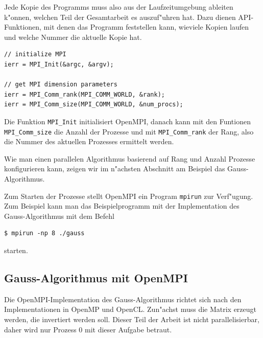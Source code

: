 Jede Kopie des Programms muss also aus der Laufzeitumgebung
ableiten k"onnen, welchen Teil der Gesamtarbeit es auszuf"uhren hat.
Dazu dienen API-Funktionen, mit denen das Programm feststellen kann,
wieviele Kopien laufen und welche Nummer die aktuelle Kopie hat.
\begin{verbatim}
// initialize MPI
ierr = MPI_Init(&argc, &argv);

// get MPI dimension parameters
ierr = MPI_Comm_rank(MPI_COMM_WORLD, &rank);
ierr = MPI_Comm_size(MPI_COMM_WORLD, &num_procs);
\end{verbatim}
Die Funktion \verb+MPI_Init+ initialisiert OpenMPI, danach kann mit
den Funtionen \verb+MPI_Comm_size+ die Anzahl der Prozesse und mit
\verb+MPI_Comm_rank+ der Rang, also die Nummer des aktuellen Prozesses
ermittelt werden.

Wie man einen parallelen Algorithmus basierend auf Rang und Anzahl
Prozesse konfigurieren kann, zeigen wir im n"achsten Abschnitt am
Beispiel das Gauss-Algorithmus.

Zum Starten der Prozesse stellt OpenMPI ein Program \verb+mpirun+
zur Verf"ugung. Zum Beispiel kann man das Beispielprogramm mit der
Implementation des Gauss-Algorithmus mit dem Befehl
\begin{verbatim}
$ mpirun -np 8 ./gauss 
\end{verbatim}
starten.

\subsection{Gauss-Algorithmus mit OpenMPI}
Die OpenMPI-Implementation des Gauss-Algorithmus richtet sich nach
den Implementationen in OpenMP und OpenCL.
Zun"achst muss die Matrix erzeugt werden, die invertiert werden soll.
Dieser Teil der Arbeit ist nicht parallelisierbar, daher wird nur Prozess 0
mit dieser Aufgabe betraut.


